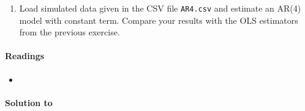 \begin{enumerate}
\begin{enumerate}
  \item Load simulated data given in the CSV file \texttt{AR4.csv} and estimate an AR{(4)} model with constant term.
  Compare your results with the OLS estimators from the previous exercise.
\end{enumerate}
\end{enumerate}

\paragraph{Readings}
\begin{itemize}
\item \textcite{Lutkepohl_2004_UnivariateTimeSeries}
\end{itemize}


\begin{solution}\textbf{Solution to }
\ifDisplaySolutions%

\fi
\newpage
\end{solution}